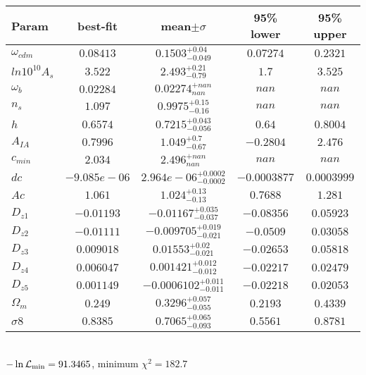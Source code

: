 \begin{tabular}{|l|c|c|c|c|} 
 \hline 
Param & best-fit & mean$\pm\sigma$ & 95\% lower & 95\% upper \\ \hline 
$\omega_{cdm }$ &$0.08413$ & $0.1503_{-0.049}^{+0.04}$ & $0.07274$ & $0.2321$ \\ 
$ln10^{10}A_{s }$ &$3.522$ & $2.493_{-0.79}^{+0.21}$ & $1.7$ & $3.525$ \\ 
$\omega_{b }$ &$0.02284$ & $0.02274_{nan}^{+nan}$ & $nan$ & $nan$ \\ 
$n_{s }$ &$1.097$ & $0.9975_{-0.16}^{+0.15}$ & $nan$ & $nan$ \\ 
$h$ &$0.6574$ & $0.7215_{-0.056}^{+0.043}$ & $0.64$ & $0.8004$ \\ 
$A_{IA }$ &$0.7996$ & $1.049_{-0.67}^{+0.7}$ & $-0.2804$ & $2.476$ \\ 
$c_{min }$ &$2.034$ & $2.496_{nan}^{+nan}$ & $nan$ & $nan$ \\ 
$dc$ &$-9.085e-06$ & $2.964e-06_{-0.0002}^{+0.0002}$ & $-0.0003877$ & $0.0003999$ \\ 
$Ac$ &$1.061$ & $1.024_{-0.13}^{+0.13}$ & $0.7688$ & $1.281$ \\ 
$D_{z1 }$ &$-0.01193$ & $-0.01167_{-0.037}^{+0.035}$ & $-0.08356$ & $0.05923$ \\ 
$D_{z2 }$ &$-0.01111$ & $-0.009705_{-0.021}^{+0.019}$ & $-0.0509$ & $0.03058$ \\ 
$D_{z3 }$ &$0.009018$ & $0.01553_{-0.021}^{+0.02}$ & $-0.02653$ & $0.05818$ \\ 
$D_{z4 }$ &$0.006047$ & $0.001421_{-0.012}^{+0.012}$ & $-0.02217$ & $0.02479$ \\ 
$D_{z5 }$ &$0.001149$ & $-0.0006102_{-0.011}^{+0.011}$ & $-0.02218$ & $0.02053$ \\ 
$\Omega_{m }$ &$0.249$ & $0.3296_{-0.055}^{+0.057}$ & $0.2193$ & $0.4339$ \\ 
$\sigma8$ &$0.8385$ & $0.7065_{-0.093}^{+0.065}$ & $0.5561$ & $0.8781$ \\ 
\hline 
 \end{tabular} \\ 
$-\ln{\cal L}_\mathrm{min} =91.3465$, minimum $\chi^2=182.7$ \\ 
